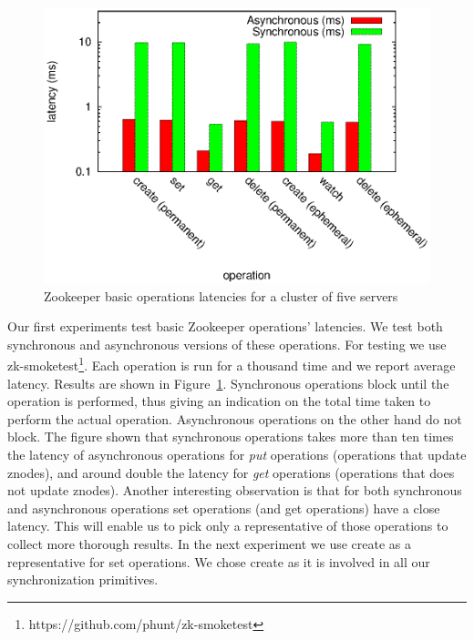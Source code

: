 \begin{figure}[ht]
\centering
\includegraphics[scale=0.75]{img/ops_latencies_logscale.eps}
\caption{Zookeeper basic operations latencies for a cluster of five servers}
\label{fig:ops_latencies}
\end{figure}

Our first experiments test basic Zookeeper operations' latencies. We test both synchronous and asynchronous versions of these operations. For testing we use zk-smoketest\footnote{https://github.com/phunt/zk-smoketest}. Each operation is run for a thousand time and we report average latency. Results are shown in Figure~\ref{fig:ops_latencies}. Synchronous operations block until the operation is performed, thus giving an indication on the total time taken to perform the actual operation. Asynchronous operations on the other hand do not block. The figure shown that synchronous operations takes more than ten times the latency of asynchronous operations for \emph{put} operations (operations that update znodes), and around double the latency for \emph{get} operations (operations that does not update znodes). Another interesting observation is that for both synchronous and asynchronous operations set operations (and get operations) have a close latency. This will enable us to pick only a representative of those operations to collect more thorough results. In the next experiment we use create as a representative for set operations. We chose create as it is involved in all our synchronization primitives.

